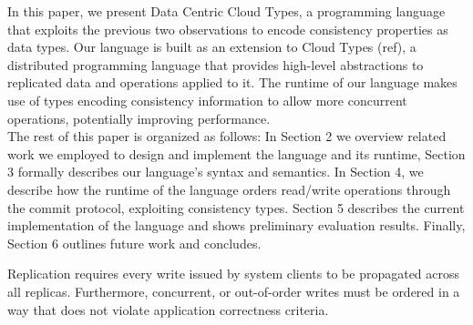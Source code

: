 In this paper, we present Data Centric Cloud Types, a programming language that
exploits the previous two observations to encode consistency properties as data
types. Our language is built as an extension to Cloud Types (ref), 
a distributed programming language that provides high-level abstractions to replicated
data and operations applied to it. The runtime of our language makes use of
types encoding 
consistency information to allow more concurrent operations, potentially
improving performance. \\

The rest of this paper is organized as follows: In Section 2 we overview related
work we employed to design and implement the language and its runtime,
Section 3 formally describes our language's syntax and
semantics. In Section 4, we describe how the runtime of the language orders
read/write operations through the commit protocol, exploiting consistency types. 
Section 5 describes the current implementation of the language and shows preliminary evaluation
results. Finally, Section 6 outlines future work and concludes. 





Replication requires every write issued by system clients to be
propagated across all replicas. Furthermore, concurrent, or out-of-order writes
must be ordered in a way that does not violate application correctness criteria.  


